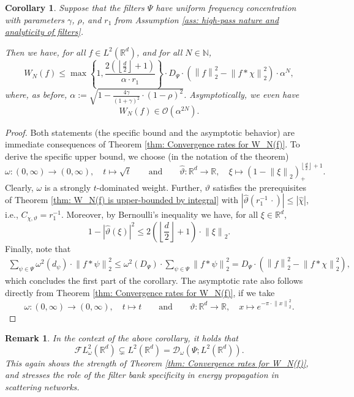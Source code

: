 \documentclass[11pt]{amsart}
\newcommand{\R}{{\mathbb{R}}}
\newcommand{\N}{\mathbb{N}}
\newcommand{\norm}[1]{\ensuremath{\left\lVert\text{}#1\text{}\right\rVert}}
\newcommand{\set}[1]{\ensuremath{\left\{\text{}#1\text{}\right\}}}
\newtheorem{corollary}[theorem]{Corollary}
\newtheorem{remark}[theorem]{Remark}
\newenvironment{proof sketch} {\textit{Proof sketch.}}{}
\begin{document}
  \begin{corollary}\label{cor: global exp decay for ufc filters}
    Suppose that the filters $\Psi$ have uniform frequency concentration with parameters $\gamma$, $\rho$, and $r_1$ from Assumption \ref{ass: high-pass nature and analyticity of filters}.
   
    Then we have, for all $f \in L^2(\R^d)$, and for all $N \in \N$,
    \[W_N(f) \leq \max\set{1,\frac{2\left(\left\lfloor\frac{d}{2}\right\rfloor+1\right)}{\alpha \cdot r_1}} \cdot D_\Psi \cdot \left(\norm{f}_{2}^2-\norm{f*\chi}_2^2\right) \cdot \alpha^{N},\]
    where, as before, $\alpha:=\sqrt{1-\frac{4\gamma}{(1+\gamma)^2}\cdot (1-\rho)^2}$. Asymptotically, we even have
    \[W_N(f) \in \mathcal{O}\left(\alpha^{2N}\right).\]
  \end{corollary}
  
  \begin{proof}
    Both statements (the specific bound and the asymptotic behavior) are immediate consequences of Theorem \ref{thm: Convergence rates for W_N(f)}. To derive the specific upper bound, we choose (in the notation of the theorem)
    \[\omega:(0,\infty)\to (0,\infty), \quad t \mapsto \sqrt{t} \qquad \text{and} \qquad \widehat{\vartheta}: \R^d \to \R, \quad \xi \mapsto \left(1-\norm{\xi}_2\right)_+^{\left\lfloor\frac{d}{2}\right\rfloor+1}.\] 
    Clearly, $\omega$ is a strongly $t$-dominated weight. Further, $\vartheta$ satisfies the prerequisites of Theorem \ref{thm: W_N(f) is upper-bounded by integral} with $|\widehat{\vartheta}(r_1^{-1}\,\cdot)| \leq |\widehat{\chi}|$, i.e., $C_{\chi,\vartheta}=r_1^{-1}$. Moreover, by Bernoulli's inequality we have, for all $\xi \in \R^d$, 
    \[1-|\widehat{\vartheta}(\xi)|^2\leq 2\left(\left\lfloor\frac{d}{2}\right\rfloor+1\right) \cdot \norm{\xi}_2.\]
    Finally, note that 
    \begin{align*}
      \sum_{\psi \in \Psi} \omega^{2}(d_\psi) \cdot \norm{f*\psi}_2^2 \leq \omega^2(D_\Psi) \cdot \sum_{\psi \in \Psi} \norm{f*\psi}_2^2 = D_\Psi \cdot \left(\norm{f}_{2}^2-\norm{f*\chi}_2^2\right),
    \end{align*} 
    which concludes the first part of the corollary.
    The asymptotic rate also follows directly from Theorem \ref{thm: Convergence rates for W_N(f)}, if we take 
    \[\omega:(0,\infty)\to (0,\infty), \quad t \mapsto t \qquad \text{and} \qquad \vartheta: \R^d \to \R, \quad x \mapsto e^{-\pi \cdot \norm{x}_2^2}.\] 
  \end{proof}
  
  \begin{remark}\label{rm: strict inclusion between Fourier weighted L2 and decomp space}
    In the context of the above corollary, it holds that 
    \[\mathcal{F}L^2_\omega(\R^d) \subsetneq L^2(\R^d)= \mathcal{D}_\omega(\Psi;L^2(\R^d)).\] 
    This again shows the strength of Theorem \ref{thm: Convergence rates for W_N(f)}, and stresses the role of the filter bank specificity in energy propagation in scattering networks.
  \end{remark}
  
\end{document}
